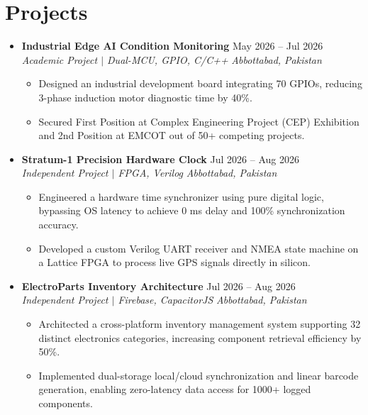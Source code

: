 \documentclass[letterpaper,10pt]{article}
\newcommand{\resumeItem}[1]{\item\small{#1}}
\newcommand{\resumeSubheading}[4]{
  \item
    \textbf{#1} \hfill #2 \\
    \textit{\small#3} \hfill \textit{\small #4}
}
\begin{document}
\section{Projects}
  \begin{itemize}[leftmargin=0in, label={}]
    
    \resumeSubheading
      {Industrial Edge AI Condition Monitoring}{May 2026 -- Jul 2026}
      {Academic Project $|$ Dual-MCU, GPIO, C/C++}{Abbottabad, Pakistan}
      \vspace{-4pt}
      \begin{itemize}[leftmargin=0.2in, label=\textbullet, itemsep=1pt]
        \resumeItem{Designed an industrial development board integrating 70 GPIOs, reducing 3-phase induction motor diagnostic time by 40\%.}
        \resumeItem{Secured First Position at Complex Engineering Project (CEP) Exhibition and 2nd Position at EMCOT out of 50+ competing projects.}
      \end{itemize}
      \vspace{4pt}

    \resumeSubheading
      {Stratum-1 Precision Hardware Clock}{Jul 2026 -- Aug 2026}
      {Independent Project $|$ FPGA, Verilog}{Abbottabad, Pakistan}
      \vspace{-4pt}
      \begin{itemize}[leftmargin=0.2in, label=\textbullet, itemsep=1pt]
        \resumeItem{Engineered a hardware time synchronizer using pure digital logic, bypassing OS latency to achieve 0 ms delay and 100\% synchronization accuracy.}
        \resumeItem{Developed a custom Verilog UART receiver and NMEA state machine on a Lattice FPGA to process live GPS signals directly in silicon.}
      \end{itemize}
      \vspace{4pt}

    \resumeSubheading
      {ElectroParts Inventory Architecture}{Jul 2026 -- Aug 2026}
      {Independent Project $|$ Firebase, CapacitorJS}{Abbottabad, Pakistan}
      \vspace{-4pt}
      \begin{itemize}[leftmargin=0.2in, label=\textbullet, itemsep=1pt]
        \resumeItem{Architected a cross-platform inventory management system supporting 32 distinct electronics categories, increasing component retrieval efficiency by 50\%.}
        \resumeItem{Implemented dual-storage local/cloud synchronization and linear barcode generation, enabling zero-latency data access for 1000+ logged components.}
      \end{itemize}
      \vspace{4pt}


\end{itemize}
\end{document}
